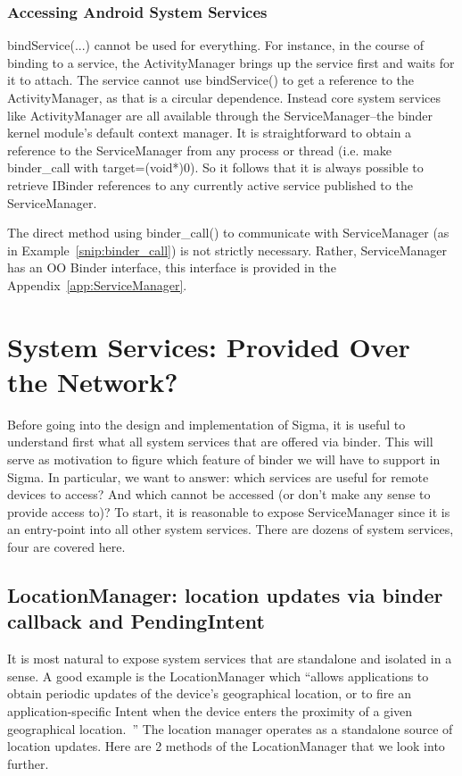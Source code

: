 \documentclass[prodmode]{acmlarge}
\begin{document}
\subsubsection{Accessing Android System Services}
bindService(...) cannot be used for everything. For instance, in the course of binding to a service, the ActivityManager brings up the service first and waits for it to attach. The service cannot use bindService() to get a reference to the ActivityManager, as that is a circular dependence. Instead core system services like ActivityManager are all available through the ServiceManager--the binder kernel module's default context manager. It is straightforward to obtain a reference to the ServiceManager from any process or thread (i.e. make binder\_call with target=(void*)0). So it follows that it is always possible to retrieve IBinder references to any currently active service published to the ServiceManager.

The direct method using binder\_call() to communicate with ServiceManager (as in Example~\ref{snip:binder_call}) is not strictly necessary. Rather, ServiceManager has an OO Binder interface, this interface is provided in the Appendix~\ref{app:ServiceManager}. 

\section{System Services: Provided Over the Network?}
\label{sec:SystemServices}
Before going into the design and implementation of Sigma, it is useful to understand first what all system services that are offered via binder. This will serve as motivation to figure which feature of binder we will have to support in Sigma. In particular, we want to answer: which services are useful for remote devices to access? And which cannot be accessed (or don't make any sense to provide access to)?  To start, it is reasonable to expose ServiceManager since it is an entry-point into all other system services. There are dozens of system services, four are covered here.

\subsection{LocationManager: location updates via binder callback and PendingIntent}
It is most natural to expose system services that are standalone and isolated in a sense. A good example is the LocationManager which ``allows applications to obtain periodic updates of the device's geographical location, or to fire an application-specific Intent when the device enters the proximity of a given geographical location.~\cite{LocationManagerDocs}'' The location manager operates as a standalone source of location updates. Here are 2 methods of the LocationManager that we look into further.
\end{document}
